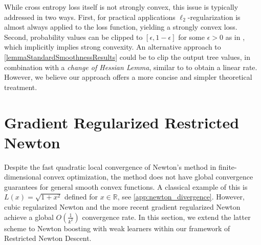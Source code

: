 \documentclass{article}
\theoremstyle{plain}
\theoremstyle{definition}
\theoremstyle{remark}
\begin{document}
While cross entropy loss itself is not strongly convex, this issue is typically addressed in two ways. First, for practical applications $\ell_2$-regularization is almost always applied to the loss function, yielding a strongly convex loss. Second, probability values can be clipped to $[\epsilon, 1-\epsilon]$ for some $\epsilon>0$ as in \cite{2014AConvergenceRateAnalysisForLogitBoostMARTAndTheirVariant}, which implicitly implies strong convexity. An alternative approach to \cref{lemmaStandardSmoothnessResults} could be to clip the output tree values, in combination with a \textit{change of Hessian Lemma}, similar to \citep[Lemma 9]{2014AConvergenceRateAnalysisForLogitBoostMARTAndTheirVariant} to obtain a linear rate. However, we believe our approach offers a more concise and simpler theoretical treatment.


\section{Gradient Regularized Restricted Newton}\label{secGradientRegularizedNewton}
Despite the fast quadratic local convergence of Newton's method in finite-dimensional convex optimization, the method does not have global convergence guarantees for general smooth convex functions. A classical example of this is $L(x) = \sqrt{1+x^2}$ defined for $x\in \mathbb{R}$, see \cref{app:newton_divergence}. However, cubic regularized Newton \cite{2006CubicRegularizationOfNewtonMethodAndItsGlobalPerformance} and the more recent gradient regularized Newton \cite{2023RegularizedNewtonMethodWithGlobalConvergence,2024GradientRegularizationOfNewtonMethodWithBregmanDistances} achieve a global $O(\frac{1}{k^2})$ convergence rate. In this section, we extend the latter scheme to Newton boosting with weak learners within our framework of Restricted Newton Descent.
\end{document}
